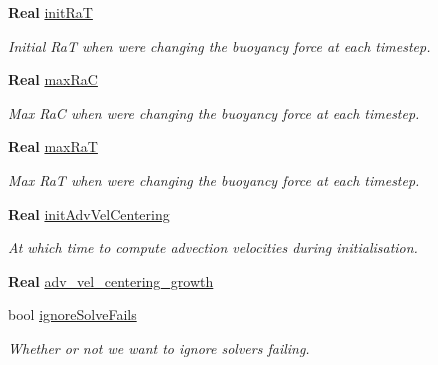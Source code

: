 \begin{DoxyCompactItemize}
\mbox{\label{struct_mushy_layer_options_a74b262b3c0d6193d9fefa9b1de1b4594}} 
\textbf{ Real} \hyperlink{struct_mushy_layer_options_a74b262b3c0d6193d9fefa9b1de1b4594}{init\+RaT}
\begin{DoxyCompactList}\small\item\em Initial RaT when we\textquotesingle{}re changing the buoyancy force at each timestep. \end{DoxyCompactList}\item 
\mbox{\label{struct_mushy_layer_options_ace80b85e9e274a8230c7b4c168bb9fe3}} 
\textbf{ Real} \hyperlink{struct_mushy_layer_options_ace80b85e9e274a8230c7b4c168bb9fe3}{max\+RaC}
\begin{DoxyCompactList}\small\item\em Max RaC when we\textquotesingle{}re changing the buoyancy force at each timestep. \end{DoxyCompactList}\item 
\mbox{\label{struct_mushy_layer_options_adedffaea8acb2f15ce2af114a9026295}} 
\textbf{ Real} \hyperlink{struct_mushy_layer_options_adedffaea8acb2f15ce2af114a9026295}{max\+RaT}
\begin{DoxyCompactList}\small\item\em Max RaT when we\textquotesingle{}re changing the buoyancy force at each timestep. \end{DoxyCompactList}\item 
\textbf{ Real} \hyperlink{struct_mushy_layer_options_abb4bbe1b7dc2088154775ac0915cd8e9}{init\+Adv\+Vel\+Centering}
\begin{DoxyCompactList}\small\item\em At which time to compute advection velocities during initialisation. \end{DoxyCompactList}\item 
\textbf{ Real} \hyperlink{struct_mushy_layer_options_a923817c4dd1baeb506c20cd081256175}{adv\+\_\+vel\+\_\+centering\+\_\+growth}
\item 
bool \hyperlink{struct_mushy_layer_options_a4bfcfa9308587a2c1fcce378eaecec1b}{ignore\+Solve\+Fails}
\begin{DoxyCompactList}\small\item\em Whether or not we want to ignore solvers failing. \end{DoxyCompactList}\item 

\end{DoxyCompactItemize}
